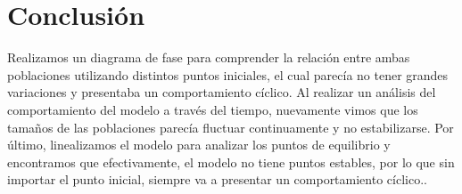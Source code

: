 \documentclass [a4paper,12pt,oneside,final]{article}
\begin{document}
\section{Conclusión}

Realizamos un diagrama de fase para comprender la relación entre ambas poblaciones utilizando distintos puntos iniciales, el cual parecía no tener grandes variaciones y presentaba un comportamiento cíclico. Al realizar un análisis del comportamiento del modelo a través del tiempo, nuevamente vimos que los tamaños de las poblaciones parecía fluctuar continuamente y no estabilizarse. Por último, linealizamos el modelo para analizar los puntos de equilibrio y encontramos que efectivamente, el modelo no tiene puntos estables, por lo que sin importar el punto inicial, siempre va a presentar un comportamiento cíclico..
\end{document}
